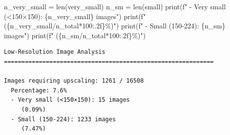 \documentclass[
  letterpaper,
  DIV=11,
  numbers=noendperiod]{scrartcl}
\newenvironment{Shaded}{\begin{snugshade}}{\end{snugshade}}
\newcommand{\BuiltInTok}[1]{\textcolor[rgb]{0.00,0.23,0.31}{#1}}
\newcommand{\DecValTok}[1]{\textcolor[rgb]{0.68,0.00,0.00}{#1}}
\newcommand{\NormalTok}[1]{\textcolor[rgb]{0.00,0.23,0.31}{#1}}
\newcommand{\OperatorTok}[1]{\textcolor[rgb]{0.37,0.37,0.37}{#1}}
\newcommand{\SpecialCharTok}[1]{\textcolor[rgb]{0.37,0.37,0.37}{#1}}
\newcommand{\SpecialStringTok}[1]{\textcolor[rgb]{0.13,0.47,0.30}{#1}}
\renewenvironment{Shaded}{%
  \begin{tcolorbox}[%
    enhanced,%
    colback=codebg,%
    colframe=codebg,%
    borderline west={3pt}{0pt}{sectionblue},%
    boxrule=0pt,%
    arc=0pt,%
    boxsep=5pt,%
    left=2mm,%
    right=2mm,%
    top=2mm,%
    bottom=2mm%
  ]%
}{%
  \end{tcolorbox}%
}
\begin{document}
\begin{Shaded}
\begin{Highlighting}[]
\NormalTok{n\_very\_small }\OperatorTok{=} \BuiltInTok{len}\NormalTok{(very\_small)}
\NormalTok{n\_sm }\OperatorTok{=} \BuiltInTok{len}\NormalTok{(small)}
\BuiltInTok{print}\NormalTok{(}\SpecialStringTok{f"  {-} Very small (\textless{}150×150): }\SpecialCharTok{\{}\NormalTok{n\_very\_small}\SpecialCharTok{\}}\SpecialStringTok{ images"}\NormalTok{)}
\BuiltInTok{print}\NormalTok{(}\SpecialStringTok{f"     (}\SpecialCharTok{\{}\NormalTok{n\_very\_small}\OperatorTok{/}\NormalTok{n\_total}\OperatorTok{*}\DecValTok{100}\SpecialCharTok{:.2f\}}\SpecialStringTok{\%)"}\NormalTok{)}
\BuiltInTok{print}\NormalTok{(}\SpecialStringTok{f"  {-} Small (150{-}224): }\SpecialCharTok{\{}\NormalTok{n\_sm}\SpecialCharTok{\}}\SpecialStringTok{ images"}\NormalTok{)}
\BuiltInTok{print}\NormalTok{(}\SpecialStringTok{f"     (}\SpecialCharTok{\{}\NormalTok{n\_sm}\OperatorTok{/}\NormalTok{n\_total}\OperatorTok{*}\DecValTok{100}\SpecialCharTok{:.2f\}}\SpecialStringTok{\%)"}\NormalTok{)}
\end{Highlighting}
\end{Shaded}

\begin{verbatim}
Low-Resolution Image Analysis
============================================================

Images requiring upscaling: 1261 / 16508
  Percentage: 7.6%
  - Very small (<150×150): 15 images
     (0.09%)
  - Small (150-224): 1233 images
     (7.47%)
\end{verbatim}
\end{document}
